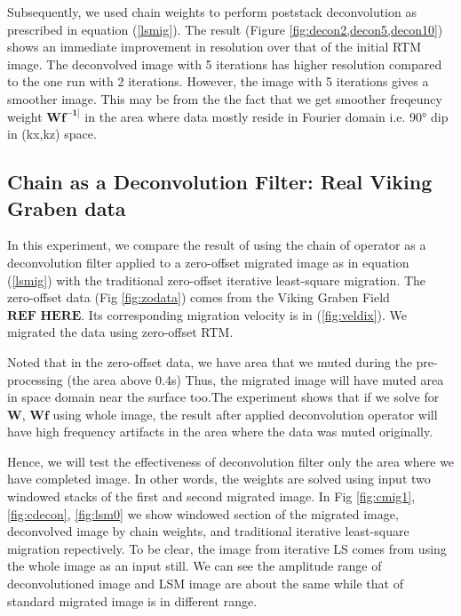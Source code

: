 

%

Subsequently, we used chain weights to perform poststack deconvolution as prescribed in equation (\ref{lsmig}). The result (Figure \ref{fig:decon2,decon5,decon10}) shows an immediate improvement in resolution over that of the initial RTM image. The deconvolved image with 5 iterations has higher resolution compared to the one run with 2 iterations. However, the image with 5 iterations gives a smoother image. This may be from the the fact that we get smoother freqeuncy weight $\mathbf{Wf^{-1]}}$ in the area where data mostly reside in Fourier domain i.e. 90° dip in (kx,kz) space.



%
%

\subsection*{Chain as a Deconvolution Filter: Real Viking Graben data}

In this experiment, we compare the result of using the chain of operator as a deconvolution filter applied to a zero-offset migrated image as in equation (\ref{lsmig}) with the traditional zero-offset iterative least-square migration. The zero-offset data (Fig \ref{fig:zodata}) comes from the Viking Graben Field $\textbf{REF HERE}$. Its corresponding migration velocity is in (\ref{fig:veldix}). We migrated the data using zero-offset RTM. 


Noted that in the zero-offset data, we have area that we muted during the pre-processing (the area above 0.4s) Thus, the migrated image will have muted area in space domain near the surface too.The experiment shows that if we solve for $\mathbf{W}$, $\mathbf{Wf}$ using whole image, the result after applied deconvolution operator will have high frequency artifacts in the area where the data was muted originally.

%
Hence, we will test the effectiveness of deconvolution filter only the area where we have completed image. In other words, the weights are solved using input two windowed stacks of the first and second migrated image. In Fig \ref{fig:cmig1}, \ref{fig:cdecon}, \ref{fig:lsm0} we show windowed section of the migrated image, deconvolved image by chain weights, and traditional iterative least-square migration repectively. To be clear, the image from iterative LS comes from using the whole image as an input still. We can see the amplitude range of deconvolutioned image and LSM image are about the same while that of standard migrated image is in different range.  


